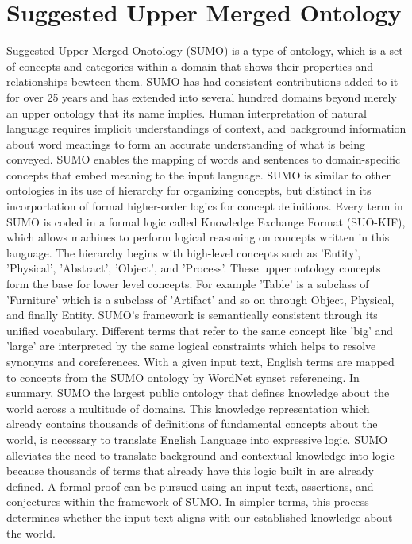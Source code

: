 \section{Suggested Upper Merged Ontology}
Suggested Upper Merged Onotology (SUMO) is a type of ontology, which is a set of concepts and categories within a domain that shows their properties and relationships bewteen them. SUMO has had consistent contributions added to it for over 25 years and has extended into several hundred domains beyond merely an upper ontology that its name implies. Human interpretation of natural language requires implicit understandings of context, and background information about word meanings to form an accurate understanding of what is being conveyed. SUMO enables the mapping of words and sentences to domain-specific concepts that embed meaning to the input language. SUMO is similar to other ontologies in its use of hierarchy for organizing concepts, but distinct in its incorportation of formal higher-order logics for concept definitions. Every term in SUMO is coded in a formal logic called Knowledge Exchange Format (SUO-KIF), which allows machines to perform logical reasoning on concepts written in this language. The hierarchy begins with high-level concepts such as 'Entity', 'Physical', 'Abstract', 'Object', and 'Process'. These upper ontology concepts form the base for lower level concepts. For example 'Table' is a subclass of 'Furniture' which is a subclass of 'Artifact' and so on through Object, Physical, and finally Entity. SUMO's framework is semantically consistent through its unified vocabulary. Different terms that refer to the same concept like 'big' and 'large' are interpreted by the same logical constraints which helps to resolve synonyms and coreferences. With a given input text, English terms are mapped to concepts from the SUMO ontology by WordNet synset referencing.
In summary, SUMO the largest public ontology that defines knowledge about the world across a multitude of domains. This knowledge representation which already contains thousands of definitions of fundamental concepts about the world, is necessary to translate English Language into expressive logic. SUMO alleviates the need to translate background and contextual knowledge into logic because thousands of terms that already have this logic built in are already defined. A formal proof can be pursued using an input text, assertions, and conjectures within the framework of SUMO. In simpler terms, this process determines whether the input text aligns with our established knowledge about the world.

